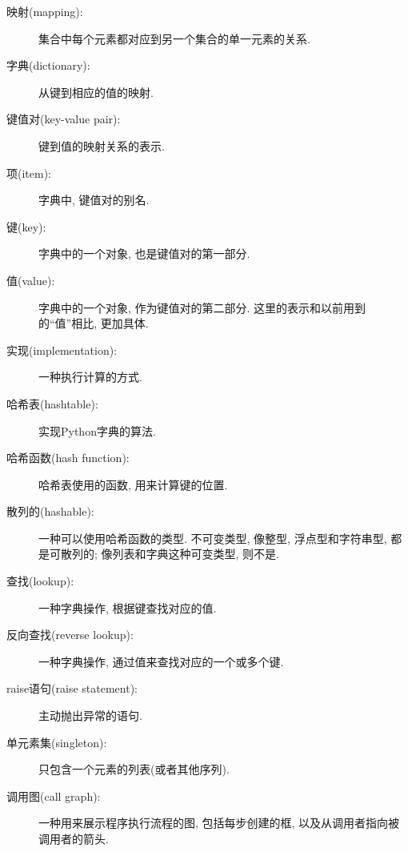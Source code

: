 \documentclass[10pt]{book}
\begin{document}
\begin{description}

\item[映射(mapping):] 集合中每个元素都对应到另一个集合的单一元素的关系.

\item[字典(dictionary):] 从键到相应的值的映射. 

\item[键值对(key-value pair):] 键到值的映射关系的表示. 

\item[项(item):] 字典中, 键值对的别名. 

\item[键(key):] 字典中的一个对象, 也是键值对的第一部分. 

\item[值(value):] 字典中的一个对象, 作为键值对的第二部分. 
这里的表示和以前用到的``值''相比, 更加具体. 

\item[实现(implementation):] 一种执行计算的方式. 

\item[哈希表(hashtable):] 实现Python字典的算法. 

\item[哈希函数(hash function):] 哈希表使用的函数, 用来计算键的位置. 

\item[散列的(hashable):] 一种可以使用哈希函数的类型. 
不可变类型, 像整型, 浮点型和字符串型, 都是可散列的;
像列表和字典这种可变类型, 则不是. 

\item[查找(lookup):] 一种字典操作, 根据键查找对应的值.

\item[反向查找(reverse lookup):] 一种字典操作, 通过值来查找对应的一个或多个键.

\item[raise语句(raise statement):]  主动抛出异常的语句.

\item[单元素集(singleton):] 只包含一个元素的列表(或者其他序列).

\item[调用图(call graph):] 一种用来展示程序执行流程的图, 包括每步创建的框, 
以及从调用者指向被调用者的箭头. 


\end{description}
\end{document}
